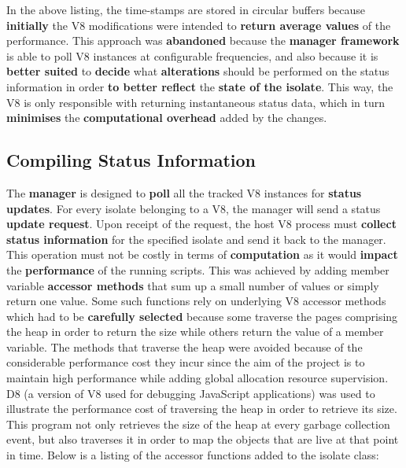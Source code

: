 \documentclass{l4proj}
\begin{document}
\hspace*{3em} In the above listing, the time-stamps are stored in circular buffers because \textbf{initially} the V8 modifications were intended to \textbf{return average values} of the performance. This approach was \textbf{abandoned} because the \textbf{manager framework} is able to poll V8 instances at configurable frequencies, and also because it is \textbf{better suited} to \textbf{decide} what \textbf{alterations} should be performed on the status information in order \textbf{to better reflect} the \textbf{state of the isolate}. This way, the V8 is only responsible with returning instantaneous status data, which in turn \textbf{minimises} the \textbf{computational overhead} added by the changes. 
\subsection{Compiling Status Information}
\hspace*{3em} The \textbf{manager} is designed to \textbf{poll} all the tracked V8 instances for \textbf{status updates}. For every isolate belonging to a V8, the manager will send a status \textbf{update request}. Upon receipt of the request, the host V8 process must \textbf{collect status information} for the specified isolate and send it back to the manager. This operation must not be costly in terms of \textbf{computation} as it would \textbf{impact} the \textbf{performance} of the running scripts. This was achieved by adding member variable \textbf{accessor methods} that sum up a small number of values or simply return one value. Some such functions rely on underlying V8 accessor methods which had to be \textbf{carefully selected} because some traverse the pages comprising the heap in order to return the size while others return the value of a member variable. The methods that traverse the heap were avoided because of the considerable performance cost they incur since the aim of the project is to maintain high performance while adding global allocation resource supervision. D8 (a version of V8 used for debugging JavaScript applications) was used to illustrate the performance cost of traversing the heap in order to retrieve its size. This program not only retrieves the size of the heap at every garbage collection event, but also traverses it in order to map the objects that are live at that point in time. Below is a listing of the accessor functions added to the isolate class:
\end{document}
